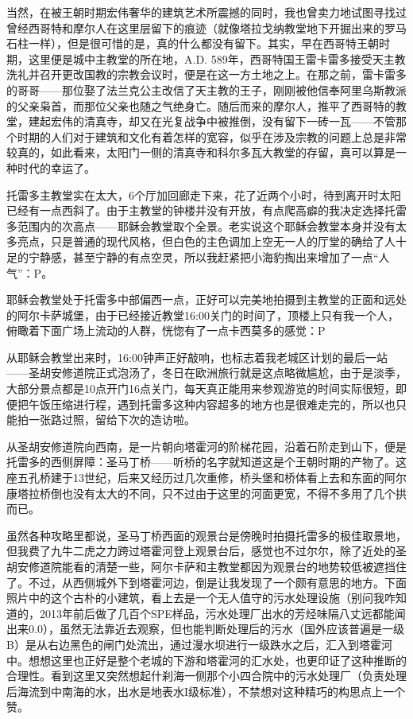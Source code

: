 \documentclass[]{book}
\begin{document}
当然，在被王朝时期宏伟奢华的建筑艺术所震撼的同时，我也曾卖力地试图寻找过曾经西哥特和摩尔人在这里层留下的痕迹（就像塔拉戈纳教堂地下开掘出来的罗马石柱一样），但是很可惜的是，真的什么都没有留下。其实，早在西哥特王朝时期，这里便是城中主教堂的所在地，A.D. 589年，西哥特国王雷卡雷多接受天主教洗礼并召开更改国教的宗教会议时，便是在这一方土地之上。在那之前，雷卡雷多的哥哥------那位娶了法兰克公主改信了天主教的王子，刚刚被他信奉阿里乌斯教派的父亲枭首，而那位父亲也随之气绝身亡。随后而来的摩尔人，推平了西哥特的教堂，建起宏伟的清真寺，却又在光复战争中被推倒，没有留下一砖一瓦------不管那个时期的人们对于建筑和文化有着怎样的宽容，似乎在涉及宗教的问题上总是非常较真的，如此看来，太阳门一侧的清真寺和科尔多瓦大教堂的存留，真可以算是一种时代的幸运了。

托雷多主教堂实在太大，6个厅加回廊走下来，花了近两个小时，待到离开时太阳已经有一点西斜了。由于主教堂的钟楼并没有开放，有点爬高癖的我决定选择托雷多范围内的次高点------耶稣会教堂取个全景。老实说这个耶稣会教堂本身并没有太多亮点，只是普通的现代风格，但白色的主色调加上空无一人的厅堂的确给了人十足的宁静感，甚至宁静的有点空灵，所以我赶紧把小海豹掏出来增加了一点``人气''：P。

耶稣会教堂处于托雷多中部偏西一点，正好可以完美地拍摄到主教堂的正面和远处的阿尔卡萨城堡，由于已经接近教堂16:00关门的时间了，顶楼上只有我一个人，俯瞰着下面广场上流动的人群，恍惚有了一点卡西莫多的感觉：P

从耶稣会教堂出来时，16:00钟声正好敲响，也标志着我老城区计划的最后一站------圣胡安修道院正式泡汤了，冬日在欧洲旅行就是这点略微尴尬，由于是淡季，大部分景点都是10点开门16点关门，每天真正能用来参观游览的时间实际很短，即便把午饭压缩进行程，遇到托雷多这种内容超多的地方也是很难走完的，所以也只能拍一张路过照，留给下次的造访啦。

从圣胡安修道院向西南，是一片朝向塔霍河的阶梯花园，沿着石阶走到山下，便是托雷多的西侧屏障：圣马丁桥------听桥的名字就知道这是个王朝时期的产物了。这座五孔桥建于13世纪，后来又经历过几次重修，桥头堡和桥体看上去和东面的阿尔康塔拉桥倒也没有太大的不同，只不过由于这里的河面更宽，不得不多用了几个拱而已。

虽然各种攻略里都说，圣马丁桥西面的观景台是傍晚时拍摄托雷多的极佳取景地，但我费了九牛二虎之力跨过塔霍河登上观景台后，感觉也不过尔尔，除了近处的圣胡安修道院能看的清楚一些，阿尔卡萨和主教堂都因为观景台的地势较低被遮挡住了。不过，从西侧城外下到塔霍河边，倒是让我发现了一个颇有意思的地方。下面照片中的这个古朴的小建筑，看上去是一个无人值守的污水处理设施（别问我咋知道的，2013年前后做了几百个SPE样品，污水处理厂出水的芳烃味隔八丈远都能闻出来0.0），虽然无法靠近去观察，但也能判断处理后的污水（国外应该普遍是一级B）是从右边黑色的闸门处流出，通过漫水坝进行一级跌水之后，汇入到塔霍河中。想想这里也正好是整个老城的下游和塔霍河的汇水处，也更印证了这种推断的合理性。看到这里又突然想起什刹海一侧那个小四合院中的污水处理厂（负责处理后海流到中南海的水，出水是地表水I级标准），不禁想对这种精巧的构思点上一个赞。
\end{document}
